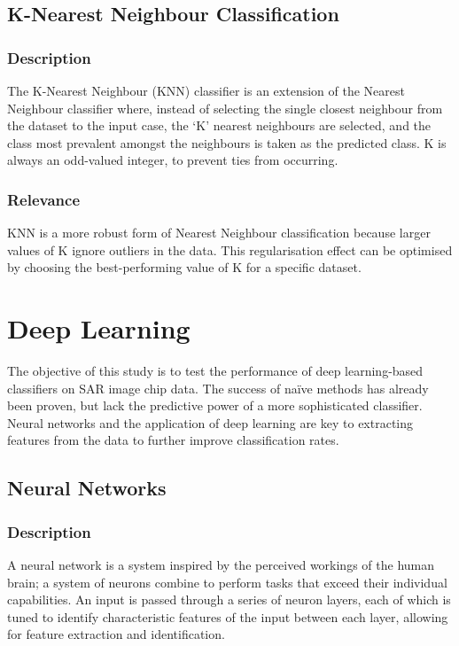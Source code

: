 \subsection{K-Nearest Neighbour Classification}\label{lit:knn}
\subsubsection{Description}
The K-Nearest Neighbour (KNN) classifier is an extension of the Nearest Neighbour classifier where, instead of selecting the single closest neighbour from the dataset to the input case, the `K' nearest neighbours are selected, and the class most prevalent amongst the neighbours is taken as the predicted class. K is always an odd-valued integer, to prevent ties from occurring\cite{keller1985fuzzy}. 

\subsubsection{Relevance}
KNN is a more robust form of Nearest Neighbour classification because larger values of K ignore outliers in the data. This regularisation effect can be optimised by choosing the best-performing value of K for a specific dataset.

\section{Deep Learning}

The objective of this study is to test the performance of deep learning-based classifiers on SAR image chip data. The success of na{\"i}ve methods has already been proven\cite{Schumacher_atrof}, but lack the predictive power of a more sophisticated classifier. Neural networks and the application of deep learning are key to extracting features from the data to further improve classification rates.

\subsection{Neural Networks}
\subsubsection{Description}
A neural network is a system inspired by the perceived workings of the human brain; a system of neurons combine to perform tasks that exceed their individual capabilities. An input is passed through a series of neuron layers, each of which is tuned to identify characteristic features of the input between each layer, allowing for feature extraction and identification. 


